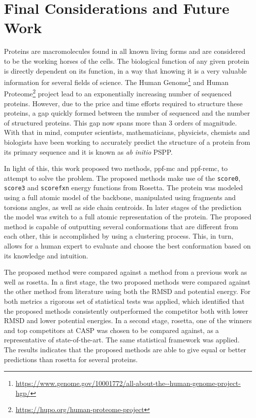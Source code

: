 \chapter{Final Considerations and Future Work}
\label{chap:final_considerations}

Proteins are macromolecules found in all known living forms and are
considered to be the working horses of the cells. The biological
function of any given protein is directly dependent on its
function, in a way that knowing it is a very valuable information
for several fields of science. The Human
Genome\footnote{\url{https://www.genome.gov/10001772/all-about-the--human-genome-project-hgp/}}
and Human Proteome\footnote{\url{https://hupo.org/human-proteome-project}} project
lead to an exponentially increasing number of sequenced proteins.
However, due to the price and time efforts required to structure
these proteins, a gap quickly formed between the number of sequenced
and the number of structured proteins. This gap now spans more than 3 orders
of magnitude. With that in mind, computer scientists, mathematicians,
physicists, chemists and biologists have been working to accurately
predict the structure of a protein from its primary
sequence and it is known as \textit{ab initio} PSPP.

In light of this, this work proposed two methods, ppf-mc and
ppf-remc, to attempt to solve the problem. The proposed methods make use of the \texttt{score0}, \texttt{score3} and \texttt{scorefxn} energy functions
from Rosetta. The protein was modeled using a full atomic model of the backbone,
manipulated using fragments and torsions angles, as well as side chain centroids.
In later stages of the prediction the model was switch to a full atomic
representation of the protein. The proposed method is capable of outputting
several conformations that are different from each other, this is accomplished
by using a clustering process. This, in turn, allows for a human expert to
evaluate and choose the best conformation based on its knowledge and intuition.

The proposed method were compared against a method from a previous work as
well as rosetta. In a first stage, the two proposed methods were compared
against the other method from literature using both the RMSD and potential energy.
For both metrics a rigorous set of statistical tests was applied, which identified that
the proposed methods consistently outperformed the competitor both with lower
RMSD and lower potential energies. In a second stage, rosetta, one of the
winners and top competitors at CASP was chosen to be compared against, as a
representative of state-of-the-art. The same statistical framework was applied.
The results indicates that the proposed methods are able to give equal or better
predictions than rosetta for several proteins.

